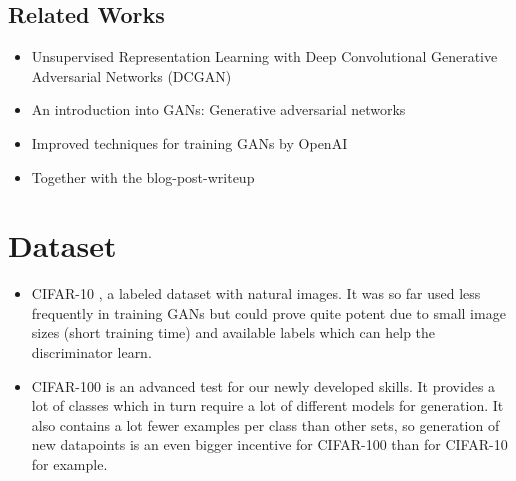 \documentclass[10pt,twocolumn,letterpaper]{article}
\begin{document}
    \subsection{Related Works}\label{sec:rel}
        \begin{itemize}
            \item Unsupervised Representation Learning with Deep Convolutional Generative Adversarial Networks (DCGAN) \cite{DBLP:journals/corr/RadfordMC15}
            \item An introduction into GANs: Generative adversarial networks \cite{goodfellow2016nips}
            \item Improved techniques for training GANs by OpenAI \cite{salimans2016improved}
            \item Together with the blog-post-writeup \cite{blog1}
        \end{itemize}

\section{Dataset}
    \begin{itemize}
        \item CIFAR-10 \cite{krizhevsky2014cifar}, a labeled dataset with natural images. It was so far used less frequently in training GANs but could prove quite potent due to small image sizes (short training time) and available labels which can help the discriminator learn.
        \item CIFAR-100 \cite{krizhevsky2014cifar} is an advanced test for our newly developed skills. It provides a lot of classes which in turn require a lot of different models for generation. It also contains a lot fewer examples per class than other sets, so generation of new datapoints is an even bigger incentive for CIFAR-100 than for CIFAR-10 for example.
    \end{itemize}
\end{document}
